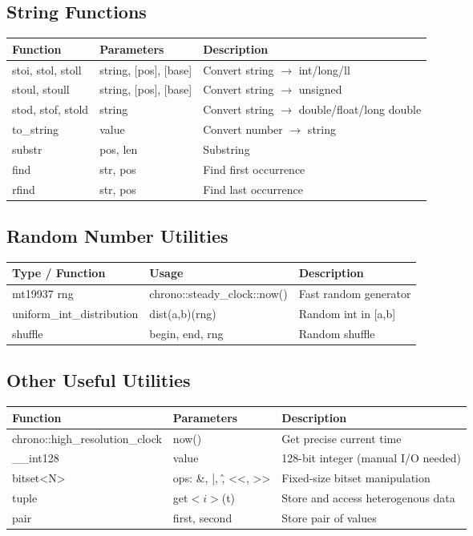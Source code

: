 \documentclass[10pt]{article}
\begin{document}
\begin{multicols*}{2}
\subsection*{String Functions}
\begin{tabularx}{\linewidth}{|l|l|X|}
    \hline
    \textbf{Function} & \textbf{Parameters} & \textbf{Description} \\
    \hline
    stoi, stol, stoll & string, [pos], [base] & Convert string $\to$ int/long/ll \\
    \hline
    stoul, stoull & string, [pos], [base] & Convert string $\to$ unsigned \\
    \hline
    stod, stof, stold & string & Convert string $\to$ double/float/long double \\
    \hline
    to\_string & value & Convert number $\to$ string \\
    \hline
    substr & pos, len & Substring \\
    \hline
    find & str, pos & Find first occurrence \\
    \hline
    rfind & str, pos & Find last occurrence \\
    \hline
\end{tabularx}

\subsection*{Random Number Utilities}
\begin{tabularx}{\linewidth}{|l|l|X|}
    \hline
    \textbf{Type / Function} & \textbf{Usage} & \textbf{Description} \\
    \hline
    mt19937 rng & chrono::steady\_clock::now() & Fast random generator \\
    \hline
    uniform\_int\_distribution & dist(a,b)(rng) & Random int in [a,b] \\
    \hline
    shuffle & begin, end, rng & Random shuffle \\
    \hline
\end{tabularx}

\subsection*{Other Useful Utilities}
\begin{tabularx}{\linewidth}{|l|l|X|}
    \hline
    \textbf{Function} & \textbf{Parameters} & \textbf{Description} \\
    \hline
    chrono::high\_resolution\_clock & now() & Get precise current time \\
    \hline
    \_\_int128 & value & 128-bit integer (manual I/O needed) \\
    \hline
    bitset<N> & ops: \&, |, \^, <<, >> & Fixed-size bitset manipulation \\
    \hline
    tuple & get$<i>$(t) & Store and access heterogenous data \\
    \hline
    pair & first, second & Store pair of values \\
    \hline
\end{tabularx}



\end{multicols*}
\end{document}
